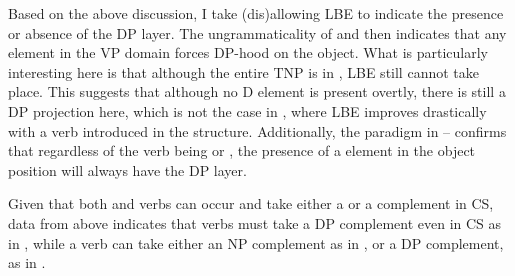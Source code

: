 \documentclass[output=paper,hidelinks,newtxmath,]{langscibook}
\begin{document}
\ea \label{15:ex18}
	\z
\z

\ea \label{15:ex19}
	\z
\z

\noindent Based on the above discussion, I take (dis)allowing LBE to indicate the presence or absence of the DP layer. The ungrammaticality of  and  then indicates that any  element in the VP domain forces DP-hood on the object. What is particularly interesting here is that although the entire TNP is in , LBE still cannot take place. This suggests that although no  D element is present overtly, there is still a DP projection here, which is not the case in , where LBE improves drastically with a  verb introduced in the structure. Additionally, the paradigm in -- confirms that regardless of the verb being  or , the presence of a  element in the object position will always have the DP layer.

Given that both  and  verbs can occur and take either a  or a  complement in CS, data from above indicates that  verbs must take a DP complement even in CS as in , while a  verb can take either an NP complement as in , or a DP complement, as in .
\end{document}
